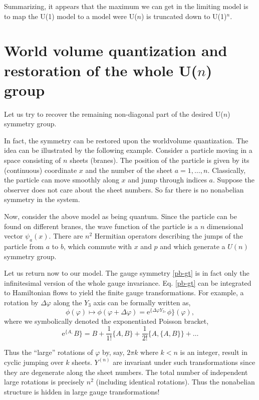 \documentclass[a4paper]{article}
\newcommand{\e}{\mathrm{e}}
\begin{document}
Summarizing, it appears that the maximum we can get in the
limiting model is to map the U(1) model to a model were U($n$) is
truncated down to U(1)$^n$.

\section{World volume quantization and restoration of the whole U($n$)
group}

Let us try to recover the remaining non-diagonal part of the
desired U($n$) symmetry group.

In fact, the symmetry can be restored upon the worldvolume
quantization. The idea can be illustrated by the following
example. Consider a particle moving in a space consisting of $n$
sheets (branes). The position of the particle is given by its
(continuous) coordinate $x$ and the number of the sheet
$a=1,\dots,n$. Classically, the particle can move smoothly along
$x$ and jump through indices $a$. Suppose the observer does not
care about the sheet numbers. So far there is no nonabelian
symmetry in the system.

Now, consider the above model as being quantum. Since the particle
can be found on different branes, the wave function of the
particle is a $n$ dimensional vector $\psi_a(x)$. There are $n^2$
Hermitian operators describing the jumps of the particle from $a$
to $b$, which commute with $x$ and $p$ and which generate a $U(n)$
symmetry group.

Let us return now to our model. The gauge symmetry \eqref{pb-gt} is in
fact only the infinitesimal version of the whole gauge
invariance. Eq. \eqref{pb-gt} can be integrated to Hamiltonian flows
to yield the finite gauge transformations. For example, a rotation by
$\Delta\varphi$ along the $Y_3$ axis can be formally written as,
\begin{equation}
\phi(\varphi)\mapsto\phi(\varphi+\Delta\varphi)=\e^{\{\Delta\varphi
Y_3,}\phi\}(\varphi),
\end{equation}
where we symbolically denoted the exponentiated Poisson bracket,
\begin{equation}
\e^{\{A,}B\}=B+\frac{1}{1!}\{A,B\}+\frac{1}{2!}\{A,\{A,B\}\}+\dots
\end{equation}

Thus the ``large'' rotations of $\varphi$ by, say, $2\pi k$ where
$k<n$ is an integer, result in cyclic jumping over $k$ sheets.
$Y^{(n)}$ are invariant under such transformations since they are
degenerate along the sheet numbers. The total number of
independent large rotations is precisely $n^2$ (including
identical rotations). Thus the nonabelian structure is hidden in
large gauge transformations!
\end{document}
